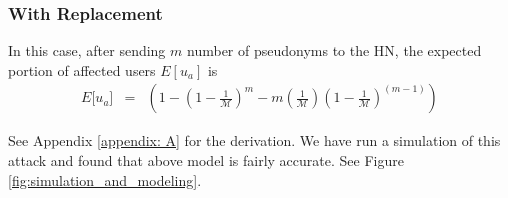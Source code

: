 \documentclass{llncs} %
\begin{document}
\subsubsection{With Replacement}
In this case, after sending $m$ number of pseudonyms to the HN, the expected portion of affected users $E[u_a]$ is
\begin{eqnarray}
E\big[ u_a \big] &=& \left(1- \left(1 - \frac{1}{\mathcal{M}}\right)^m - m\left(\frac{1}{\mathcal{M}}\right)\left(1 - \frac{1}{\mathcal{M}}\right)^{\left(m-1 \right)} \right) \label{eqn:avg_with_replacement}
\end{eqnarray} 

See Appendix \ref{appendix: A} for the derivation. We have run a simulation of this attack and found that above model is fairly accurate. See Figure \ref{fig:simulation_and_modeling}.
\end{document}
